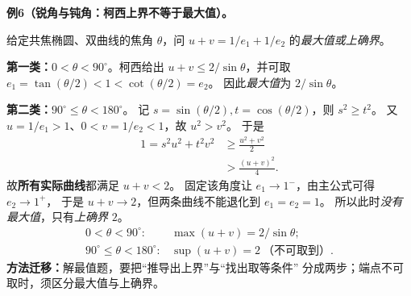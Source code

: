 \clearpage
\begin{examplebox}
\textbf{例6（锐角与钝角：柯西上界不等于最大值）。}

给定共焦椭圆、双曲线的焦角 $\theta$，问
$u+v=1/e_1+1/e_2$ 的\emph{最大值或上确界}。

\textbf{第一类：}$0<\theta<90^\circ$。柯西给出
$u+v\le2/\sin\theta$，并可取
$e_1=\tan(\theta/2)<1<\cot(\theta/2)=e_2$。
因此\emph{最大值}为 $2/\sin\theta$。

\textbf{第二类：}$90^\circ\le\theta<180^\circ$。
记 $s=\sin(\theta/2),t=\cos(\theta/2)$，则 $s^2\ge t^2$。
又 $u=1/e_1>1$、$0<v=1/e_2<1$，故 $u^2>v^2$。
于是
\[
\begin{aligned}
1=s^2u^2+t^2v^2
&\ge\frac{u^2+v^2}{2}\\
&>\frac{(u+v)^2}{4}.
\end{aligned}
\]
故\textbf{所有实际曲线}都满足 $u+v<2$。
固定该角度让 $e_1\to1^-$，由主公式可得 $e_2\to1^+$，
于是 $u+v\to2$，但两条曲线不能退化到 $e_1=e_2=1$。
所以此时\emph{没有最大值}，只有\emph{上确界} $2$。
\[
\boxed{\begin{array}{ll}
0<\theta<90^\circ:&\max(u+v)=2/\sin\theta;\\[2pt]
90^\circ\le\theta<180^\circ:&\sup(u+v)=2\ \text{（不可取到）}.
\end{array}}
\]
\textbf{方法迁移：}解最值题，要把“推导出上界”与“找出取等条件”
分成两步；端点不可取时，须区分最大值与上确界。
\end{examplebox}
